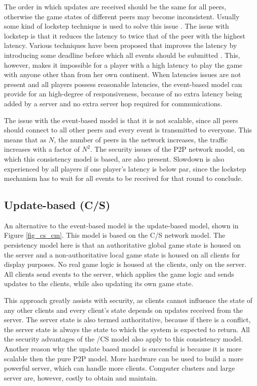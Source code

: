 \documentclass[10pt,a4paper,journal,cspaper,compsoc]{IEEEtran}
\begin{document}
The order in which updates are received should be the same for all peers, otherwise the game states of different peers may become inconsistent.
Usually some kind of lockstep technique is used to solve this issue \cite{pessimistic_lock_step}. The issue with lockstep is that it reduces the
latency to twice that of the peer with the highest latency. Various techniques have been proposed that improves the latency by introducing some
deadline before which all events should be submitted \cite{cheat_proof_event_ordering}. This, however, makes it impossible for a player with a high
latency to play the game with anyone other than from her own continent. When latencies issues are not present and all players possess reasonable
latencies, the event-based model can provide for an high-degree of responsiveness, because of no extra latency being added by a server and no extra
server hop required for communications.

The issue with the event-based model is that it is not scalable, since all peers should connect to all other peers and every event is transmitted to
everyone. This means that as $N$, the number of peers in the network increases, the traffic increases with a factor of $N^2$. The security issues of
the P2P network model, on which this consistency model is based, are also present. Slowdown is also experienced by all players if one player's
latency is below par, since the lockstep mechanism has to wait for all events to be received for that round to conclude.

\subsection{Update-based (C/S)}

An alternative to the event-based model is the update-based model, shown in Figure \ref{fig_cs_cm}. This model is based on the C/S network model. The
persistency model here is that an authoritative global game state is housed on the server and a non-authoritative local game state is housed on all
clients for display purposes. No real game logic is housed at the clients, only on the server. All clients send events to the server, which applies
the game logic and sends updates to the clients, while also updating its own game state.

This approach greatly assists with security, as clients cannot influence the state of any other clients and every client's state depends on updates
received from the server. The server state is also termed authoritative, because if there is a conflict, the server state is always the state to
which the system is expected to return. All the security advantages of the /CS model also apply to this consistency model. Another reason why the
update based model is successful is because it is more scalable then the pure P2P model. More hardware can be used to build a more powerful server,
which can handle more clients. Computer clusters and large server are, however, costly to obtain and maintain.
\end{document}
